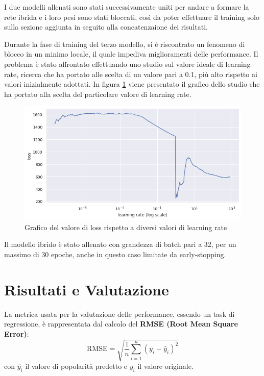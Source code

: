     I due modelli allenati sono stati successivamente uniti per andare a formare la rete ibrida e i loro pesi sono stati bloccati, così da poter effettuare il training 
    solo sulla sezione aggiunta in seguito alla concatenzaione dei risultati.

    Durante la fase di training del terzo modello, si è riscontrato un fenomeno di blocco in un minimo locale, il quale impediva miglioramenti delle performance. Il problema
    è stato affrontato effettuando uno studio sul valore ideale di learning rate, ricerca che ha portato alle scelta di un valore pari a 0.1, più alto rispetto ai valori inizialmente
    adottati. In figura \ref{fig:learning_rate} viene presentato il grafico dello studio che ha portato alla scelta del particolare valore di learning rate.
        \begin{figure}[H]
            \centering
            \includegraphics[scale=0.5]{Plot/learning-rate.png}
            \caption{Grafico del valore di loss rispetto a diversi valori di learning rate}
            \label{fig:learning_rate}
        \end{figure}

    Il modello ibrido è stato allenato con grandezza di batch pari a 32, per un massimo di 30 epoche, anche in questo caso limitate da early-stopping.




\newpage


\section{Risultati e Valutazione}

La metrica usata per la valutazione delle performance, essendo un task di regressione, è rappresentata dal calcolo del \textbf{RMSE (Root Mean Square Error)}:
\[
\textrm{RMSE} = \sqrt{\frac{1}{n} \sum_{i=1}^{n} (y_i - \hat{y}_i)^2} 
\]
con $\hat{y}_i$ il valore di popolarità predetto e $y_i$ il valore originale.


